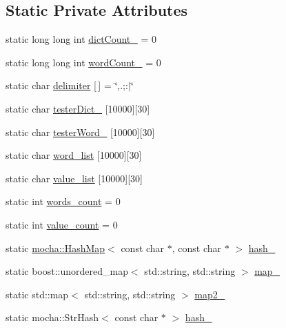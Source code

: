 \subsection*{Static Private Attributes}
\begin{DoxyCompactItemize}
\item 
static long long int \hyperlink{class_hash_auto_tester_a8e6aab9fbd4242ef0da4cd17b2d83a71}{dictCount\_\-} = 0
\item 
static long long int \hyperlink{class_hash_auto_tester_ada6a80f9c7e08c3e78d7c2ef51dbf7ad}{wordCount\_\-} = 0
\item 
static char \hyperlink{class_hash_auto_tester_a1fba2a89e3d92be80dedec69d26b4804}{delimiter} \mbox{[}$\,$\mbox{]} = \char`\"{},.;:$|$\char`\"{}
\item 
static char \hyperlink{class_hash_auto_tester_a502dc4d49d4e41271f7cc1689e011517}{testerDict\_\-} \mbox{[}10000\mbox{]}\mbox{[}30\mbox{]}
\item 
static char \hyperlink{class_hash_auto_tester_a40971169bef9fb9ff71aebf085df0887}{testerWord\_\-} \mbox{[}10000\mbox{]}\mbox{[}30\mbox{]}
\item 
static char \hyperlink{class_hash_auto_tester_acdcaf3007c079d2a487d7f563e242f6f}{word\_\-list} \mbox{[}10000\mbox{]}\mbox{[}30\mbox{]}
\item 
static char \hyperlink{class_hash_auto_tester_a6e8f47420c983f91a55aaa802238d6dd}{value\_\-list} \mbox{[}10000\mbox{]}\mbox{[}30\mbox{]}
\item 
static int \hyperlink{class_hash_auto_tester_a72b30119794749f0caef8c846a8ff5bf}{words\_\-count} = 0
\item 
static int \hyperlink{class_hash_auto_tester_a199d2ba715b72cda4e2b7342b4eb43d5}{value\_\-count} = 0
\item 
static \hyperlink{classmocha_1_1_hash_map}{mocha::HashMap}$<$ const char $\ast$, const char $\ast$ $>$ \hyperlink{class_hash_auto_tester_ab194f0824e6b0550a9e2cc1311c18504}{hash\_\-}
\item 
static boost::unordered\_\-map$<$ std::string, std::string $>$ \hyperlink{class_hash_auto_tester_a0ed734e4fb32a1b9a7fa3db99000b5af}{map\_\-}
\item 
static std::map$<$ std::string, std::string $>$ \hyperlink{class_hash_auto_tester_afc77d5d2a22b98d635cb1051c90baaa1}{map2\_\-}
\item 
static mocha::StrHash$<$ const char $\ast$ $>$ \hyperlink{class_hash_auto_tester_a6a7806bc0d52aec47e0ae6b535b80fd5}{hash\_\-}
\end{DoxyCompactItemize}


